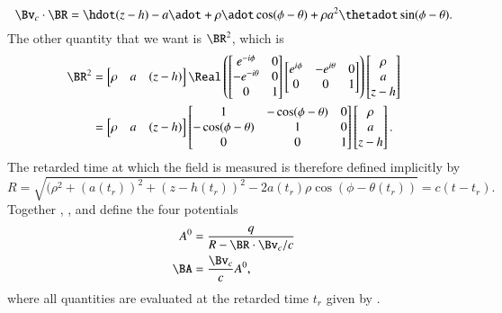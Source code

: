 {\begin{equation}
\Bv_c \cdot \BR = \hdot (z - h) -a \adot + \rho \adot \cos(\phi- \theta) + \rho a^2 \thetadot \sin(\phi - \theta).
\end{equation}
The other quantity that we want is \(\BR^2\), which is
\begin{equation}\label{eqn:relativisticElectrodynamicsExamReflection:1270}
\begin{aligned}
\BR^2 &=
\begin{bmatrix}
\rho &
a &
(z - h)
\end{bmatrix}
\Real \left(
\begin{bmatrix}
e^{-i\phi}  & 0 \\
-e^{-i\theta}  & 0 \\
0 & 1
\end{bmatrix}
\begin{bmatrix}
e^{i\phi} & -e^{i\theta} & 0 \\
0 & 0 & 1
\end{bmatrix}
\right)
\begin{bmatrix}
\rho \\
a \\
z - h
\end{bmatrix} \\
&=
\begin{bmatrix}
\rho &
a &
(z - h)
\end{bmatrix}
\begin{bmatrix}
1 & -\cos(\phi-\theta) & 0 \\
-\cos(\phi-\theta) & 1 & 0 \\
0 & 0 & 1
\end{bmatrix}
\begin{bmatrix}
\rho \\
a \\
z - h
\end{bmatrix}.
\end{aligned}
\end{equation}
%
The retarded time at which the field is measured is therefore defined implicitly by
%
\begin{equation}\label{eqn:relativisticElectrodynamicsExamReflection:900}
R = \sqrt{(\rho^2 + (a(t_r))^2 + (z-h(t_r))^2 - 2 a(t_r) \rho \cos(\phi - \theta(t_r))} = c( t - t_r).
\end{equation}
%
Together , , and  define the four potentials
%
\begin{equation}\label{eqn:relativisticElectrodynamicsExamReflection:910}
\begin{aligned}
A^0 &= \frac{q}{R - \BR \cdot \Bv_c/c} \\
\BA &= \frac{\Bv_c}{c} A^0,
\end{aligned}
\end{equation}
%
where all quantities are evaluated at the retarded time \(t_r\) given by .

}
